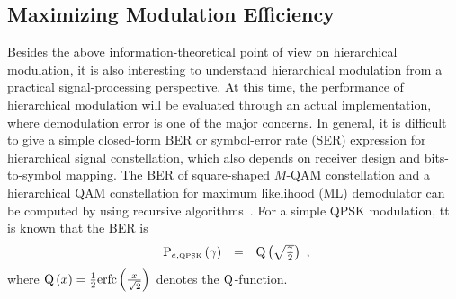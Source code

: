 \documentclass[conference]{IEEEtran}
\begin{document}
\subsection{Maximizing Modulation Efficiency}
Besides the above information-theoretical point of view on
hierarchical modulation, it is also interesting to understand
hierarchical modulation from a practical signal-processing
perspective. At this time, the performance of hierarchical
modulation will be evaluated through an actual implementation,
where demodulation error is one of the major concerns. In general,
it is difficult to give a simple closed-form BER or symbol-error
rate (SER) expression for hierarchical signal constellation, which
also depends on receiver design and bits-to-symbol mapping. The
BER of square-shaped $M$-QAM constellation and a hierarchical QAM
constellation for maximum likelihood (ML) demodulator can be
computed by using recursive algorithms~\cite{Vitt03}. For a simple
QPSK modulation, tt is known that the BER is
\begin{equation}
\begin{array}{rcl}
{\rm P}_{e,\mbox{\tiny QPSK}}\left(\gamma\right)&=&{\rm
Q}\left(\sqrt{\frac{\gamma}{2}}\right)
\end{array},\label{BER_QPSK}
\end{equation}
\noindent where ${\rm Q}\left(x\right)=\frac{1}{2}{\rm
erfc}\left(\frac{x}{\sqrt{2}}\right)$ denotes the $\rm
Q$-function.
\begin{figure} 
\end{figure}
\end{document}
